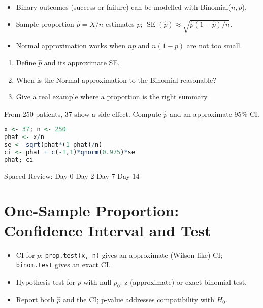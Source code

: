 \documentclass[11pt,a4paper]{article}
\def\textbf#1{#1}%
\newcommand{\reviewticks}{
  \vspace{0.4em}
  \noindent\scriptsize\textbf{Spaced Review:}
  \fbox{\phantom{D0}} Day 0\quad
  \fbox{\phantom{D2}} Day 2\quad
  \fbox{\phantom{D7}} Day 7\quad
  \fbox{\phantom{D14}} Day 14
}
\begin{document}
\begin{corebox}
\begin{itemize}
  \item Binary outcomes (success or failure) can be modelled with Binomial(\(n, p\)).
  \item Sample proportion \(\hat p = X/n\) estimates \(p\); \(\operatorname{SE}(\hat p) \approx \sqrt{\hat p(1-\hat p)/n}\).
  \item Normal approximation works when \(np\) and \(n(1-p)\) are not too small.
\end{itemize}
\end{corebox}

\begin{recallbox}
\begin{enumerate}
  \item Define \(\hat p\) and its approximate SE.
  \item When is the Normal approximation to the Binomial reasonable?
  \item Give a real example where a proportion is the right summary.
\end{enumerate}
\end{recallbox}

\begin{practicebox}
From 250 patients, 37 show a side effect. Compute \(\hat p\) and an approximate 95\% CI.
\end{practicebox}

\begin{rbox}
\begin{lstlisting}[language=R]
x <- 37; n <- 250
phat <- x/n
se <- sqrt(phat*(1-phat)/n)
ci <- phat + c(-1,1)*qnorm(0.975)*se
phat; ci
\end{lstlisting}
\end{rbox}

\reviewticks

\section{One-Sample Proportion: Confidence Interval and Test}

\begin{corebox}
\begin{itemize}
  \item CI for \(p\): \texttt{prop.test(x, n)} gives an approximate (Wilson-like) CI; \texttt{binom.test} gives an exact CI.
  \item Hypothesis test for \(p\) with null \(p_0\): z (approximate) or exact binomial test.
  \item Report both \(\hat p\) and the CI; p-value addresses compatibility with \(H_0\).
\end{itemize}
\end{corebox}
\end{document}
